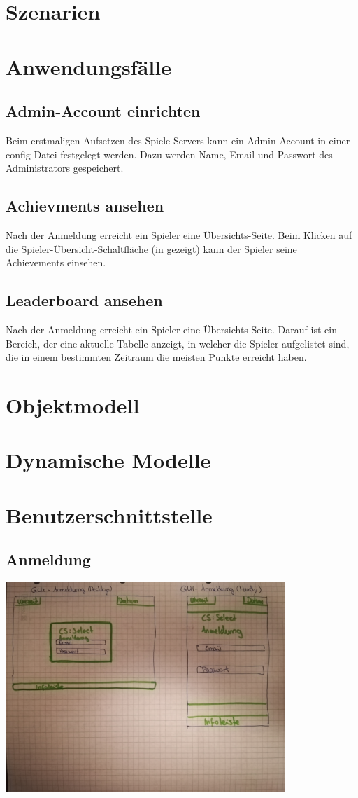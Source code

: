 \documentclass[a4paper]{scrreprt}
\begin{document}
    \section{Szenarien}
    \section{Anwendungsfälle}
    \subsection{Admin-Account einrichten}
    Beim erstmaligen Aufsetzen des \Gls{Spiele-Server}s kann ein Admin-Account in einer config-Datei festgelegt werden.
    Dazu werden Name, Email und Passwort des \Gls{Administrator}s gespeichert.
    \subsection{Achievments ansehen}
    Nach der Anmeldung erreicht ein \Gls{Spieler} eine Übersichts-Seite. Beim Klicken auf die Spieler-Übersicht-Schaltfläche
    (in  gezeigt) kann der \Gls{Spieler} seine \Gls{Achievement}s einsehen.
    \subsection{Leaderboard ansehen}
    Nach der Anmeldung erreicht ein \Gls{Spieler} eine Übersichts-Seite. Darauf ist ein Bereich, der eine aktuelle Tabelle
    anzeigt, in welcher die \Gls{Spieler} aufgelistet sind, die in einem bestimmten Zeitraum die meisten Punkte erreicht haben.

    \section{Objektmodell}

    \section{Dynamische Modelle}

    \section{Benutzerschnittstelle}
    \subsection{Anmeldung}
    \centering
    \includegraphics[width=400px]{../pictures/1_Anmeldung.jpg}
\end{document}
